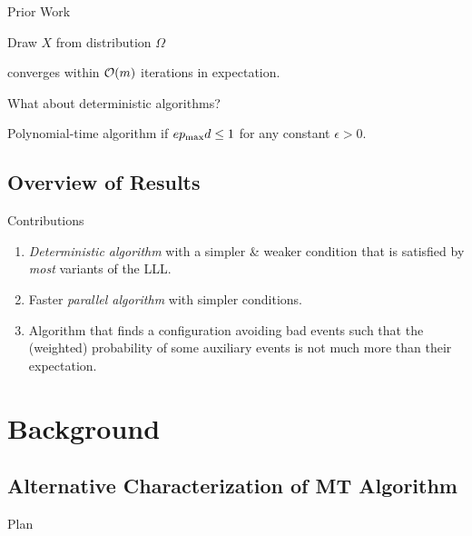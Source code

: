 \documentclass{beamer}
\def\spadding{\vspace{0.25cm}}
\begin{document}
\begin{frame}{Prior Work}
\begin{algorithm}[H]
    Draw $X$ from distribution $\Omega$\;
\end{algorithm}\pause
\follows converges within $\mathcal{O}(m)$ iterations in expectation.\pause\spadding

What about deterministic algorithms?\pause\par
Polynomial-time algorithm if $e p_\mathrm{max} d \leq 1$ for any constant $\epsilon > 0$.
\end{frame}

\subsection{Overview of Results}
\begin{frame}{Contributions}
\begin{enumerate}
    \item \emph{Deterministic algorithm} with a simpler \& weaker condition that is satisfied by \emph{most} variants of the LLL.\pause
    \item Faster \emph{parallel algorithm} with simpler conditions.\pause
    \item Algorithm that finds a configuration avoiding bad events such that the (weighted) probability of some auxiliary events is not much more than their expectation.
\end{enumerate}
\end{frame}

\section{Background}
\subsection{Alternative Characterization of MT Algorithm}
\begin{frame}{Plan}
\tableofcontents[currentsection, sectionstyle=show/shaded, hideothersubsections]
\end{frame}
\end{document}
